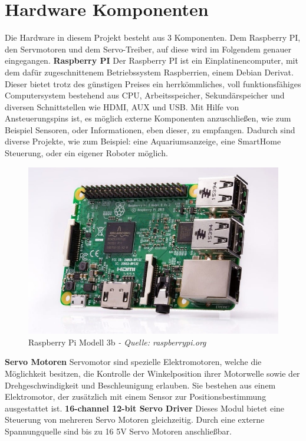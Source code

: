 \documentclass[12pt,					%
							 oneside,			%
							 a4paper,			%
							 halfparskip,		%
							 liststotoc,			%
							 bibtotoc,			%
							 fleqn,				%
							 pointlessnumbers]	%
							 {scrreprt}
\begin{document}
\section{Hardware Komponenten}
Die Hardware in diesem Projekt besteht aus 3 Komponenten. Dem Raspberry PI, den Servmotoren und dem Servo-Treiber, auf diese wird im Folgendem genauer eingegangen. \newline \newline
\textbf{Raspberry PI} \newline
Der Raspberry PI  ist ein Einplatinencomputer, mit dem dafür zugeschnittenem Betriebssystem \glqq{}Raspberrien\grqq{}, einem Debian Derivat. Dieser bietet trotz des günstigen Preises ein herrkömmliches, voll funktionsfähiges Computersystem bestehend aus CPU, Arbeitsspeicher, Sekundärspeicher und diversen Schnittstellen wie HDMI, AUX und USB. Mit Hilfe von Ansteuerungspins ist, es möglich externe Komponenten anzuschließen, wie zum Beispiel Sensoren, oder Informationen, eben dieser, zu empfangen. Dadurch sind diverse Projekte, wie zum Beispiel: eine Aquariumsanzeige, eine SmartHome Steuerung, oder ein eigener Roboter möglich.\newline\newline
\begin{figure}[h!]
	\centering
	\includegraphics[scale=0.55]{pictures/raspberryPi3b.jpg}
	\caption{Raspberry Pi Modell 3b \textit{- Quelle: raspberrypi.org\cite{Foundation2020}}}
\end{figure}

\textbf{Servo Motoren}\newline
	Servomotor sind spezielle Elektromotoren, welche die Möglichkeit besitzen, die Kontrolle der Winkelposition ihrer Motorwelle sowie der Drehgeschwindigkeit und Beschleunigung erlauben. Sie bestehen aus einem Elektromotor, der zusätzlich mit einem Sensor zur Positionsbestimmung ausgestattet ist.\newline\newline
\textbf{16-channel 12-bit Servo Driver}\newline
	Dieses Modul bietet eine Steuerung von mehreren Servo Motoren gleichzeitig. Durch eine externe Spannungquelle sind bis zu 16 5V Servo Motoren anschließbar.
\end{document}
